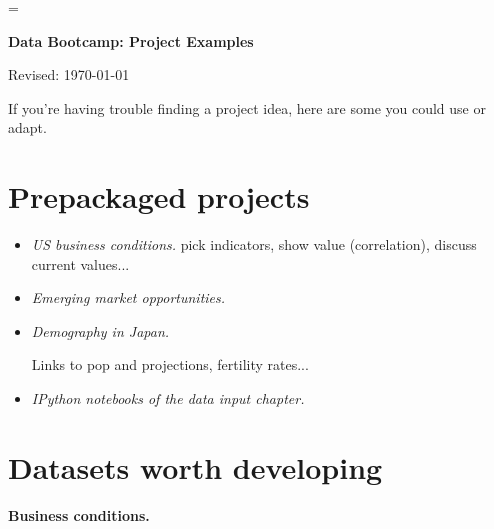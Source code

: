 \documentclass[11pt]{article}
\begin{document}
\parskip=\bigskipamount
\parindent=0.0in
\thispagestyle{empty}


\bigskip\bigskip
\centerline{\Large \bf Data Bootcamp:  Project Examples}
\centerline{Revised: \today}

\medskip
If you're having trouble finding a project idea, here are some you could use or adapt.

\section*{Prepackaged projects}

\begin{itemize}
\item {\it US business conditions.\/}
pick indicators, show value (correlation), discuss current values... 

\item {\it Emerging market opportunities.\/}


\item {\it Demography in Japan.\/}

Links to pop and projections, fertility rates...

\item {\it IPython notebooks of the data input chapter.\/} 

\end{itemize}


\section*{Datasets worth developing}



{\bf Business conditions.\/}



\end{document}
